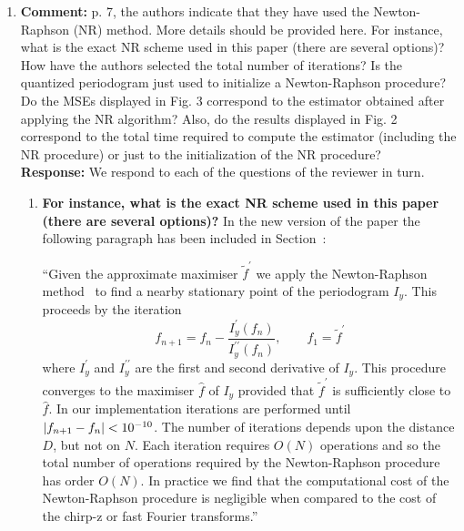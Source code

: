 \documentclass[a4paper,10pt]{article}
\begin{document}
\begin{enumerate}
\begin{enumerate}
\end{enumerate}

\item\textbf{Comment:}\label{com:rev1:nr}
p. 7, the authors indicate that they have used the Newton-Raphson (NR)
method. More details should be provided here. For instance, what is the exact
NR scheme used in this paper (there are several options)? How have the
authors selected the total number of iterations? Is the quantized periodogram
just used to initialize a Newton-Raphson procedure? Do the MSEs displayed
in Fig. 3 correspond to the estimator obtained after applying the NR algorithm?
Also, do the results displayed in Fig. 2 correspond to the total time
required to compute the estimator (including the NR procedure) or just to the
initialization of the NR procedure?
\\
\textbf{Response:}
We respond to each of the questions of the reviewer in turn.

\begin{enumerate}
\item \textbf{For instance, what is the exact NR scheme used in this paper (there are several options)?}  
In the new version of the paper the following paragraph has been included in Section~:

``Given the approximate maximiser $\widetilde{f}^\prime$ we apply the Newton-Raphson method~\cite{Ypma_historical_newton_raphson_1995} to find a nearby stationary point of the periodogram $I_y$.  This proceeds by the iteration
\[
f_{n+1} = f_{n} - \frac{I_y^\prime(f_n)}{I_y^{\prime\prime}(f_n)}, \qquad f_{1} = \widetilde{f}^\prime
\]
where $I_y^\prime$ and $I_y^{\prime\prime}$ are the first and second derivative of $I_y$. This procedure converges to the maximiser $\hat{f}$ of $I_y$ provided that $\widetilde{f}^\prime$ is sufficiently close to $\hat{f}$.  In our implementation iterations are performed until $\vert f_{n+1}-f_n \vert < 10^{-10}$.  The number of iterations depends upon the distance $D$, but not on $N$.  Each iteration requires $O(N)$ operations and so the total number of operations required by the Newton-Raphson procedure has order $O(N)$.  In practice we find that the computational cost of the Newton-Raphson procedure is negligible when compared to the cost of the chirp-z or fast Fourier transforms.''



\end{enumerate}
\end{enumerate}
\end{document}
